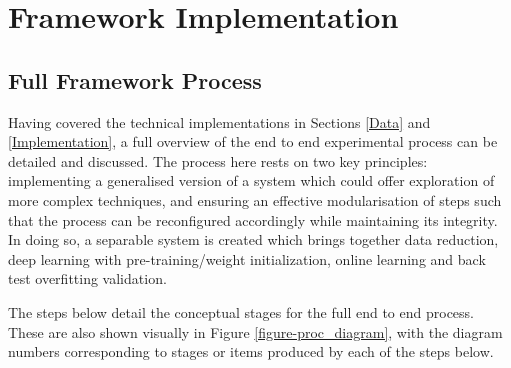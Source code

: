 \documentclass[a4paper,11pt,oneside]{article}
\theoremstyle{plain}
\theoremstyle{definition}
\begin{document}
		
		
	\newpage	
	\section{Framework Implementation}\label{imp_proc}
	
	\subsection{Full Framework Process}\label{imp_fullproc}
	
	Having covered the technical implementations in Sections \ref{Data} and \ref{Implementation}, a full overview of the end to end experimental process can be detailed and discussed. The process here rests on two key principles: implementing a generalised version of a system which could offer exploration of more complex techniques, and ensuring an effective modularisation of steps such that the process can be reconfigured accordingly while maintaining its integrity. In doing so, a separable system is created which brings together data reduction, deep learning with pre-training/weight initialization, online learning and back test overfitting validation.\newline 

	The steps below detail the conceptual stages for the full end to end process. These are also shown visually in Figure \ref{figure-proc_diagram}, with the diagram numbers corresponding to stages or items produced by each of the steps below.
	
\end{document}
